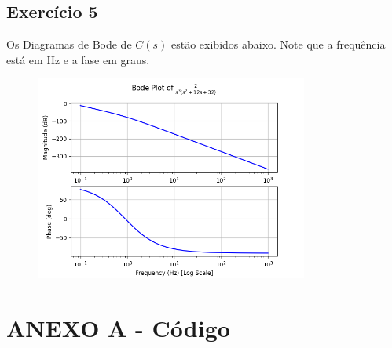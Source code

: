 \documentclass[12pt]{scrartcl}
\begin{document}
\subsection*{Exercício 5}

Os Diagramas de Bode de $C(s)$ estão exibidos abaixo. Note que a frequência está em Hz 
e a fase em graus.

\begin{figure}[h!]
	\begin{center}
    \includegraphics[width=0.8\textwidth,trim=1 1 1 1,clip]{ex5.png}
	\end{center}
\end{figure}

\newpage

\section*{ANEXO A - Código}
\end{document}
